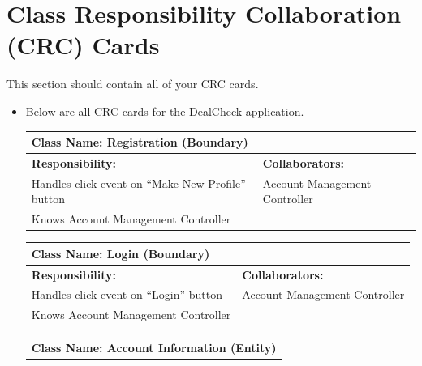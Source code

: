 \documentclass[]{article}
\begin{document}

	
\section{Class Responsibility Collaboration (CRC) Cards}
\label{sec:class_responsibility_collaboration_crc_cards}
This section should contain all of your CRC cards.

\begin{itemize}
	\item Below are all CRC cards for the DealCheck application.
        \begin{table}[H]
            \centering
            \begin{tabular}{|p{6cm}|p{6cm}|}
            \hline 
          \multicolumn{2}{|l|}{\textbf{Class Name: Registration (Boundary)}} \\
            \hline
            \textbf{Responsibility:} & \textbf{Collaborators:} \\
            \hline
               Handles click-event on “Make New Profile” button & Account        Management Controller \\
                 Knows Account Management Controller &\\
            \hline
            \end{tabular}
        \end{table}
        \begin{table}[H]
            \centering
            \begin{tabular}{|p{6cm}|p{6cm}|}
            \hline 
             \multicolumn{2}{|l|}{\textbf{Class Name: Login (Boundary)}} \\
            \hline
            \textbf{Responsibility:} & \textbf{Collaborators:} \\
            \hline
            Handles click-event on “Login” button &  Account Management Controller \\
                Knows Account Management Controller & \\
            \hline
            \end{tabular}
        \end{table}
        \begin{table}[H]
            \centering
            \begin{tabular}{|p{6cm}|p{6cm}|}
            \hline 
             \multicolumn{2}{|l|}{\textbf{Class Name: Account Information (Entity)}} \\

\end{tabular}
\end{table}
\end{itemize}
\end{document}
